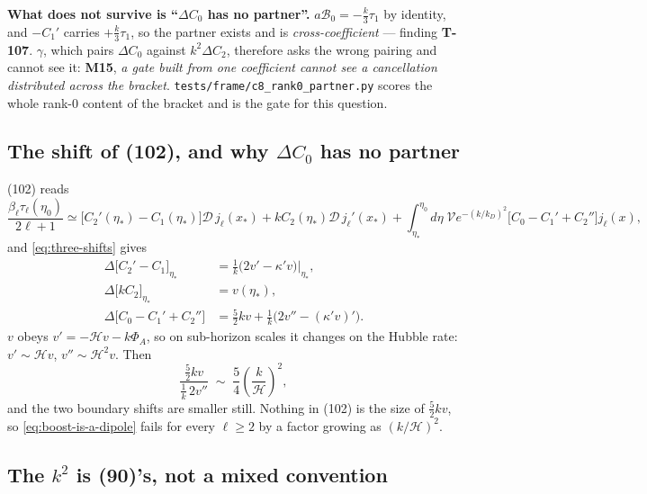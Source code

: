 \textbf{What does not survive is ``$\Delta C_0$ has no partner''.}
$a\mathcal B_0=-\tfrac k3\tau_1$ by identity, and $-C_1'$ carries
$+\tfrac k3\tau_1$, so the partner exists and is \emph{cross-coefficient} ---
finding \textbf{T-107}. $\gamma$, which pairs $\Delta C_0$ against
$k^2\Delta C_2$, therefore asks the wrong pairing and cannot see it:
\textbf{M15}, \emph{a gate built from one coefficient cannot see a
cancellation distributed across the bracket}.
\texttt{tests/frame/c8\_rank0\_partner.py} scores the whole rank-0 content of
the bracket and is the gate for this question.

\subsection{The shift of (102), and why $\Delta C_0$ has no partner}

(102) reads
\begin{equation}
  \frac{\beta_\ell\tau_\ell(\eta_0)}{2\ell+1}\simeq
  \big[C_2'(\eta_*)-C_1(\eta_*)\big]\mathcal D\,j_\ell(x_*)
  +kC_2(\eta_*)\mathcal D\,j_\ell'(x_*)
  +\int_{\eta_*}^{\eta_0}\!\!d\eta\;\mathcal V e^{-(k/k_D)^2}
   \big[C_0-C_1'+C_2''\big]j_\ell(x),
  \label{eq:102-here}
\end{equation}
and \eqref{eq:three-shifts} gives
\begin{align}
  \Delta\big[C_2'-C_1\big]_{\eta_*} &= \tfrac1k\big(2v'-\kappa'v\big)\Big|_{\eta_*},\\
  \Delta\big[kC_2\big]_{\eta_*} &= v(\eta_*),\\
  \Delta\big[C_0-C_1'+C_2''\big] &= \tfrac52kv
    +\tfrac1k\big(2v''-(\kappa'v)'\big).
  \label{eq:shift-integrand}
\end{align}
$v$ obeys $v'=-\mathcal Hv-k\Phi_A$, so on sub-horizon scales it changes on the
Hubble rate: $v'\sim\mathcal Hv$, $v''\sim\mathcal H^2v$. Then
\begin{equation}
  \frac{\tfrac52kv}{\tfrac1k\,2v''}\;\sim\;\frac54\left(\frac{k}{\mathcal H}\right)^{2},
  \label{eq:no-partner}
\end{equation}
and the two boundary shifts are smaller still. Nothing in (102) is the size of
$\tfrac52kv$, so \eqref{eq:boost-is-a-dipole} fails for every $\ell\ge2$ by a
factor growing as $(k/\mathcal H)^2$.

\subsection{The $k^2$ is (90)'s, not a mixed convention}

